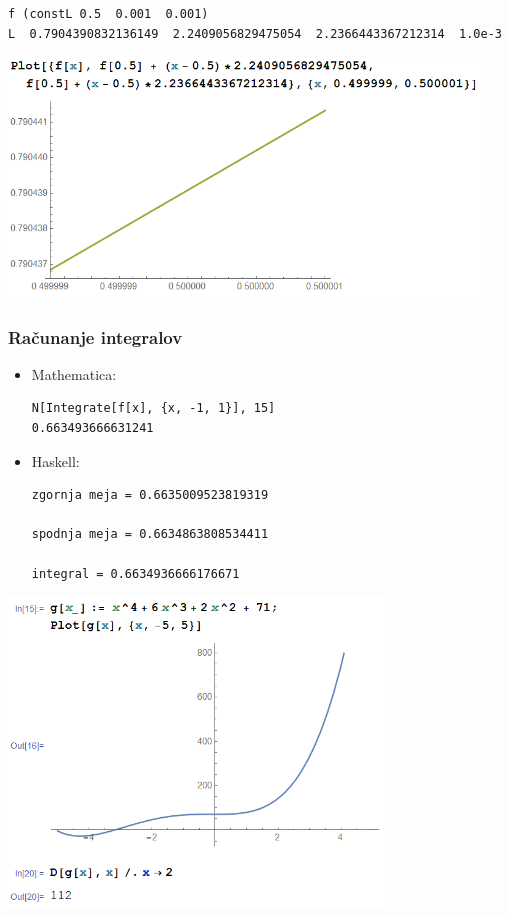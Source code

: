 \documentclass[9pt,table]{beamer}
\begin{document}
\begin{frame}[fragile]
\begin{verbatim}
f (constL 0.5  0.001  0.001)
L  0.7904390832136149  2.2409056829475054  2.2366443367212314  1.0e-3
\end{verbatim}\pause
\includegraphics[width=12.5cm]{graf6.png}
\end{frame}

\begin{frame}[fragile]
\frametitle{Računanje integralov}
\begin{itemize}
\item Mathematica:
\begin{verbatim}
N[Integrate[f[x], {x, -1, 1}], 15]
0.663493666631241
\end{verbatim}
\pause
\vspace{7mm}
\item Haskell:
\begin{verbatim}
zgornja meja = 0.6635009523819319

spodnja meja = 0.6634863808534411

integral = 0.6634936666176671
\end{verbatim}
\end{itemize}
\end{frame}





\begin{frame}[fragile]
\includegraphics[width=10cm]{graf7.png}
\end{frame}
\end{document}

